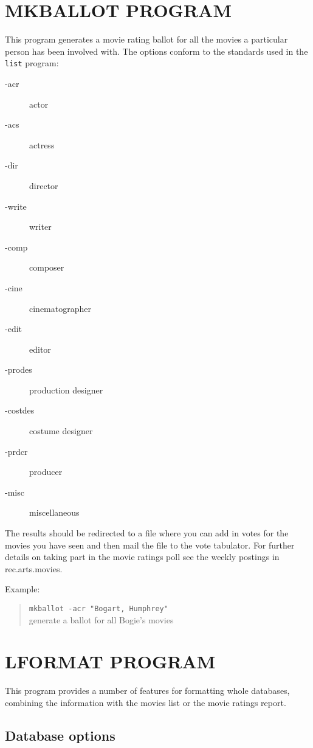 \clearpage
\section{\label{mkballot}MKBALLOT PROGRAM}

This program generates a movie rating ballot for all the movies a 
particular person has been involved with. The options conform to 
the standards used in the {\tt list} program:

\begin{description}
\item[-acr] actor
\item[-acs] actress
\item[-dir] director
\item[-write] writer
\item[-comp] composer
\item[-cine] cinematographer
\item[-edit] editor
\item[-prodes] production designer
\item[-costdes] costume designer
\item[-prdcr] producer
\item[-misc] miscellaneous
\end{description}

The results should be redirected to a file where you can add in votes for
the movies you have seen and then mail the file to the vote tabulator. For
further details on taking part in the movie ratings poll see the weekly
postings in rec.arts.movies.

Example:
\begin{quote}
{\tt mkballot -acr "Bogart, Humphrey"}\\
generate a ballot for all Bogie's movies
\end{quote}

\clearpage
\section{LFORMAT PROGRAM}

This program provides a number of features for formatting whole databases,
combining the information with the movies list or the movie ratings 
report. 

\subsection{Database options}

